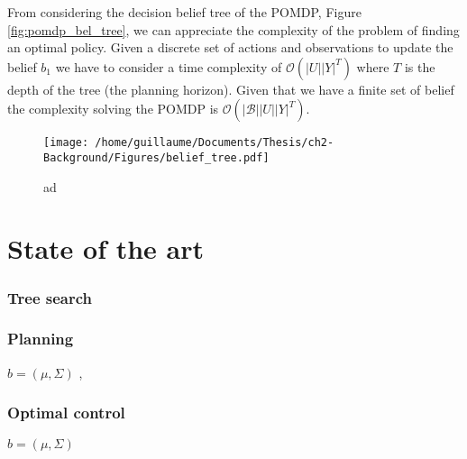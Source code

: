 From considering the decision belief tree of the POMDP, Figure \ref{fig:pomdp_bel_tree}, we can appreciate the complexity of the problem
of finding an optimal policy. Given a discrete set of actions and observations to update the belief $b_1$ we have to consider a time 
complexity of $\mathcal{O}(|U||Y|^T)$ where $T$ is the depth of the tree (the planning horizon). Given that we have a finite set of 
belief the complexity solving the POMDP is $\mathcal{O}(|\mathcal{B}||U||Y|^T)$. 


\begin{figure}[h]
 \centering
 \texttt{[image: /home/guillaume/Documents/Thesis/ch2-Background/Figures/belief\_tree.pdf]}
  \caption{ad}
\end{figure}


\section{State of the art}






%
%
%
%
%

\cite{Sol_POMDP_Policy_space_1998}

\subsubsection{Tree search}

\subsubsection{Planning}
$b = (\mu,\Sigma)$
\cite{Quadrator_2008},\cite{BelRoadMap_2009}


\subsubsection{Optimal control}
$b = (\mu,\Sigma)$
 
